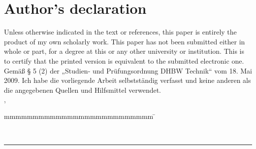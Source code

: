 \thispagestyle{empty}

\section*{Author's declaration}

\vspace*{2em}
Unless otherwise indicated in the text or references, this paper is entirely the product of my own scholarly work. This paper has not been submitted either in whole or part, for a degree at this or any other university or institution. This is to certify that the printed version is equivalent to the submitted electronic one.\\

Gemäß § 5 (2) der „Studien- und Prüfungsordnung DHBW Technik“ vom 18. Mai 2009.
Ich habe die vorliegende Arbeit selbstständig verfasst und keine anderen als die angegebenen Quellen und Hilfsmittel verwendet.
\vspace*{3em}\\
\abgabeort, \datumAbgabe\\
\begin{tabbing}
	mmmmmmmmmmmmmmmmmmmmmmmmmm     \= \kill


	\vspace*{4em}\\
	\rule{6cm}{0.4pt}
	\autor	



\end{tabbing}